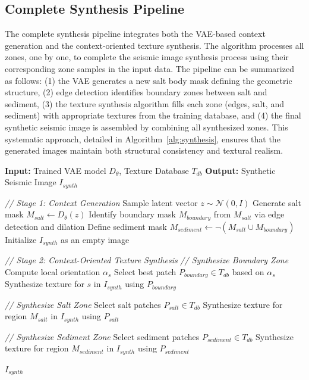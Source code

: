 \documentclass{ieeeaccess}
\begin{document}
\subsection{Complete Synthesis Pipeline}

The complete synthesis pipeline integrates both the VAE-based context generation and the context-oriented texture synthesis. The algorithm processes all zones, one by one, to complete the seismic image synthesis process using their corresponding zone samples in the input data. The pipeline can be summarized as follows: (1) the VAE generates a new salt body mask defining the geometric structure, (2) edge detection identifies boundary zones between salt and sediment, (3) the texture synthesis algorithm fills each zone (edges, salt, and sediment) with appropriate textures from the training database, and (4) the final synthetic seismic image is assembled by combining all synthesized zones. This systematic approach, detailed in Algorithm~\ref{alg:synthesis}, ensures that the generated images maintain both structural consistency and textural realism.

\begin{algorithm}[htbp]
\caption{Context-Oriented Seismic Image Synthesis}
\label{alg:synthesis}
\begin{algorithmic}[1]
\State \textbf{Input:} Trained VAE model $D_\theta$, Texture Database $T_{db}$
\State \textbf{Output:} Synthetic Seismic Image $I_{synth}$

\vspace{0.2cm}
\Statex \textit{// Stage 1: Context Generation}
\State Sample latent vector $z \sim \mathcal{N}(0, I)$
\State Generate salt mask $M_{salt} \leftarrow D_\theta(z)$
\State Identify boundary mask $M_{boundary}$ from $M_{salt}$ via edge detection and dilation
\State Define sediment mask $M_{sediment} \leftarrow \neg(M_{salt} \cup M_{boundary})$
\State Initialize $I_{synth}$ as an empty image

\vspace{0.2cm}
\Statex \textit{// Stage 2: Context-Oriented Texture Synthesis}
\State \textit{// Synthesize Boundary Zone}
    \State Compute local orientation $\alpha_s$
    \State Select best patch $P_{boundary} \in T_{db}$ based on $\alpha_s$
    \State Synthesize texture for $s$ in $I_{synth}$ using $P_{boundary}$
\EndFor

\State \textit{// Synthesize Salt Zone}
\State Select salt patches $P_{salt} \in T_{db}$
\State Synthesize texture for region $M_{salt}$ in $I_{synth}$ using $P_{salt}$

\State \textit{// Synthesize Sediment Zone}
\State Select sediment patches $P_{sediment} \in T_{db}$
\State Synthesize texture for region $M_{sediment}$ in $I_{synth}$ using $P_{sediment}$

\vspace{0.2cm}
\State \Return $I_{synth}$
\end{algorithmic}
\end{algorithm}
\end{document}
